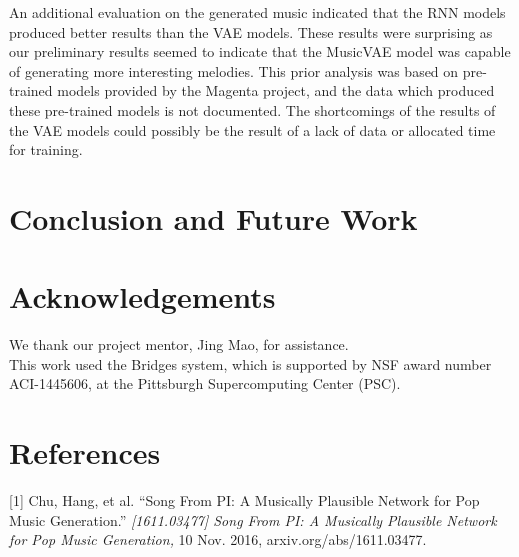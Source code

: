 \documentclass{article}
\begin{document}
An additional evaluation on the generated music indicated that the RNN models produced better results than the VAE models. These results were surprising as our preliminary results seemed to indicate that the MusicVAE model was capable of generating more interesting melodies. This prior analysis was based on pre-trained models provided by the Magenta project, and the data which produced these pre-trained models is not documented. The shortcomings of the results of the VAE models could possibly be the result of a lack of data or allocated time for training.



\section{Conclusion and Future Work}



\section{Acknowledgements}
We thank our project mentor, Jing Mao, for assistance.\\

This work used the Bridges system, which is supported by NSF award number ACI-1445606, at the Pittsburgh Supercomputing Center (PSC).

\section*{References}


\small

[1] Chu, Hang, et al. ``Song From PI: A Musically Plausible Network for Pop Music Generation.'' {\it [1611.03477] Song From PI: A Musically Plausible Network for Pop Music Generation,} 10 Nov. 2016, arxiv.org/abs/1611.03477.
\end{document}
